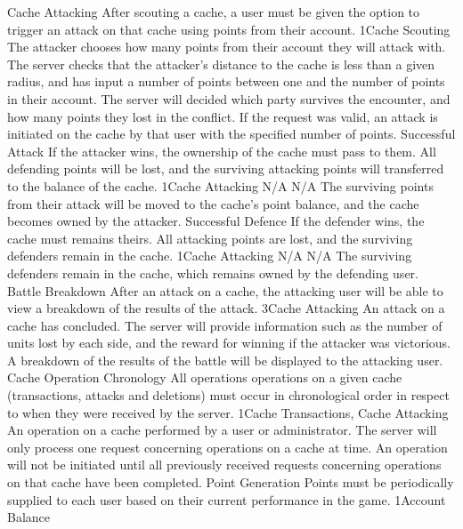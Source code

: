 		\funcreq
			{Cache Attacking}
			{After scouting a cache, a user must be given the option to 
			trigger an attack on that cache using points from their account.}
			{1}{Cache Scouting}
			{The attacker chooses how many points from their account they will 
			attack with.}
			{The server checks that the attacker's distance to the cache is
			less than a given radius, and has input a number of points between
			one and the number of points in their account. The server will
			decided which party survives the encounter, and how many points
			they lost in the conflict.}
			{If the request was valid, an attack is initiated on the cache by 
			that user with the specified number of points.}
		\funcreq
			{Successful Attack}
			{If the attacker wins, the ownership of the cache must pass to
			them. All defending points will be lost, and the surviving
			attacking points will transferred to the balance of the cache.}
			{1}{Cache Attacking}
			{N/A}
			{N/A}
			{The surviving points from their attack will be moved to the 
			cache's point balance, and the cache becomes owned by the attacker.
			}
		\funcreq
			{Successful Defence}
			{If the defender wins, the cache must remains theirs. All attacking 
			points are lost, and the surviving defenders remain in the cache.}
			{1}{Cache Attacking}
			{N/A}
			{N/A}
			{The surviving defenders remain in the cache, which remains owned 
			by the defending user.}
		\funcreq
			{Battle Breakdown}
			{After an attack on a cache, the attacking user will be able to
			view a breakdown of the results of the attack.}
			{3}{Cache Attacking}
			{An attack on a cache has concluded.}
			{The server will provide information such as the number of units
			lost by each side, and the reward for winning if the attacker was
			victorious.}
			{A breakdown of the results of the battle will be displayed to the
			attacking user.}
		\funcreq
			{Cache Operation Chronology}
			{All operations operations on a given cache (transactions, attacks
			and deletions) must occur in chronological order in respect to when
			they were received by the server.}
			{1}{Cache Transactions, Cache Attacking}
			{An operation on a cache performed by a user or administrator.}
			{The server will only process one request concerning operations on
			a cache at time.}
			{An operation will not be initiated until all
			previously received requests concerning operations on that cache
			have been completed.}
		\funcreq
			{Point Generation}
			{Points must be periodically supplied to each user based on their 
			current performance in the game.}
			{1}{Account Balance}
